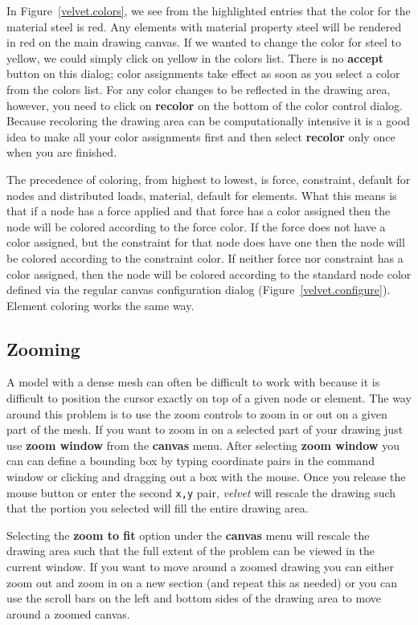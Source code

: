 In Figure~\ref{velvet.colors},
we see from the highlighted entries that the color for the material steel
is red.  Any elements with material property steel will be rendered in red
on the main drawing canvas.  If we wanted to change the color for steel to
yellow, we could simply click on yellow in the colors list.  There is no
{\bf accept} button on this dialog; color assignments take effect as soon
as you select a color from the colors list.  For any color changes
to be reflected in the drawing area, however, you need to click on 
{\bf recolor} on the bottom of the color control dialog.  Because recoloring 
the drawing area can be computationally intensive it is a good idea to 
make all your color assignments first and then select {\bf recolor} only
once when you are finished.

The precedence of coloring, from highest to lowest, is force, constraint, 
default for nodes and distributed loads, material, default for elements.  What
this means is that if a node has a force applied and that force has a color
assigned then the node will be colored according to the force color.  If the
force does not have a color assigned, but the constraint for that node does
have one then the node will be colored according to the constraint color.
If neither force nor constraint has a color assigned, then the node will 
be colored according to the standard node color defined via the regular
canvas configuration dialog (Figure~\ref{velvet.configure}).  Element
coloring works the same way.

\subsection{Zooming}
A model with a dense mesh can often be difficult to work with because it
is difficult to position the cursor exactly on top of a given node or element.
The way around this problem is to use the zoom controls to zoom in or out on
a given part of the mesh.  If you want to zoom in 
on a selected part of your drawing just use {\bf zoom window} from the
{\bf canvas} menu.  After selecting {\bf zoom window}
you can can define a bounding box by typing coordinate pairs in the command
window or clicking and dragging out a box with the mouse.  Once you
release the mouse button or enter the second {\tt x,y} pair, {\em velvet}
will rescale the drawing such that the portion you selected will fill the
entire drawing area.

Selecting the {\bf zoom to fit} option under the {\bf canvas} menu will 
rescale the drawing area such that the full extent of 
the problem can be viewed in the current window.  If you want to move around
a zoomed drawing you can either zoom out and zoom in on a new section (and 
repeat this as needed) or you can use the scroll bars on the left and bottom 
sides of the drawing area to move around a zoomed canvas.

